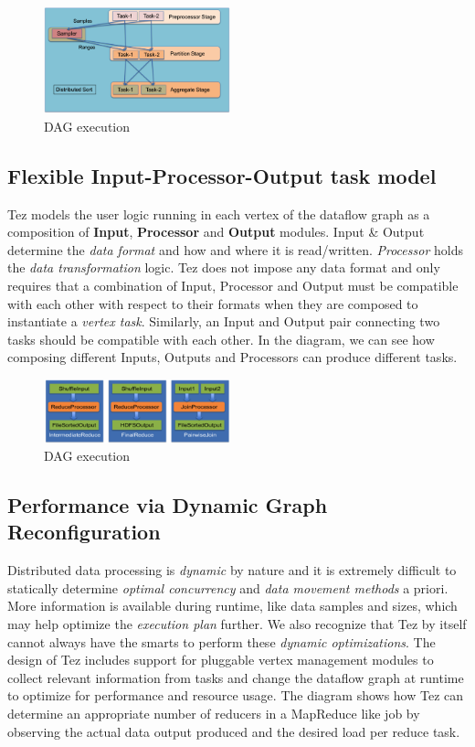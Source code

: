 \documentclass[twocolumn]{article}
\begin{document}
\begin{figure}[htb]
        \centering
        \includegraphics[width=0.48\textwidth]{tez1}
        \caption{DAG execution}
        \label{fig03}
\end{figure}

\subsection{Flexible Input-Processor-Output task model}

Tez models the user logic running in each vertex of the dataflow graph
as a composition of \textbf{Input}, \textbf{Processor} and
\textbf{Output} modules. Input \& Output determine the \emph{data
format} and how and where it is read/written. \emph{Processor} holds the
\emph{data transformation} logic. Tez does not impose any data format
and only requires that a combination of Input, Processor and Output must
be compatible with each other with respect to their formats when they
are composed to instantiate a \emph{vertex task}. Similarly, an Input
and Output pair connecting two tasks should be compatible with each
other. In the diagram, we can see how composing different Inputs,
Outputs and Processors can produce different tasks.

\begin{figure}[htb]
        \centering
        \includegraphics[width=0.48\textwidth]{tez2}
        \caption{DAG execution}
        \label{fig04}
\end{figure}

\subsection{Performance via Dynamic Graph Reconfiguration}

Distributed data processing is \emph{dynamic} by nature and it is
extremely difficult to statically determine \emph{optimal concurrency}
and \emph{data movement methods} a priori. More information is available
during runtime, like data samples and sizes, which may help optimize the
\emph{execution plan} further. We also recognize that Tez by itself
cannot always have the smarts to perform these \emph{dynamic
optimizations}. The design of Tez includes support for pluggable vertex
management modules to collect relevant information from tasks and change
the dataflow graph at runtime to optimize for performance and resource
usage. The diagram shows how Tez can determine an appropriate number of
reducers in a MapReduce like job by observing the actual data output
produced and the desired load per reduce task.
\end{document}
